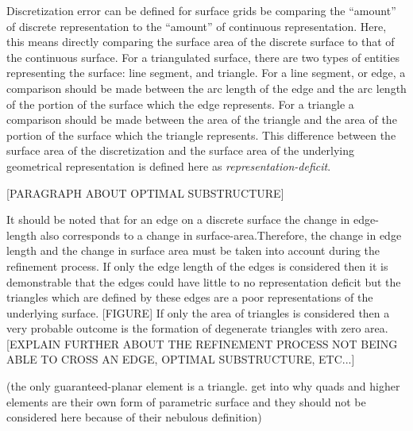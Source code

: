 Discretization error can be defined for surface grids be comparing the
``amount'' of discrete representation to the ``amount'' of continuous
representation. Here, this means directly comparing the surface area of
the discrete surface to that of the continuous surface. For a
triangulated surface, there are two types of entities representing the
surface: line segment, and triangle. For a line segment, or edge, a
comparison should be made between the arc length of the edge and the arc
length of the portion of the surface which the edge represents. For a
triangle a comparison should be made between the area of the triangle
and the area of the portion of the surface which the triangle
represents. This difference between the surface area of the
discretization and the surface area of the underlying geometrical
representation is defined here as {\it representation-deficit}.

[PARAGRAPH ABOUT OPTIMAL SUBSTRUCTURE]

It should be noted that for an edge on a discrete surface the change in
edge-length also corresponds to a change in surface-area.Therefore, the
change in edge length and the change in surface area must be taken into
account during the refinement process. If only the edge length of the
edges is considered then it is demonstrable that the edges could have
little to no representation deficit but the triangles which are defined
by these edges are a poor representations of the underlying surface.
[FIGURE] If only the area of triangles is considered then a very
probable outcome is the formation of degenerate triangles with zero
area. [EXPLAIN FURTHER ABOUT THE REFINEMENT PROCESS NOT BEING ABLE TO
CROSS AN EDGE, OPTIMAL SUBSTRUCTURE, ETC...]

(the only guaranteed-planar element is a triangle. get into why quads and higher
elements are their own form of parametric surface and they should
not be considered here because of their nebulous definition)
